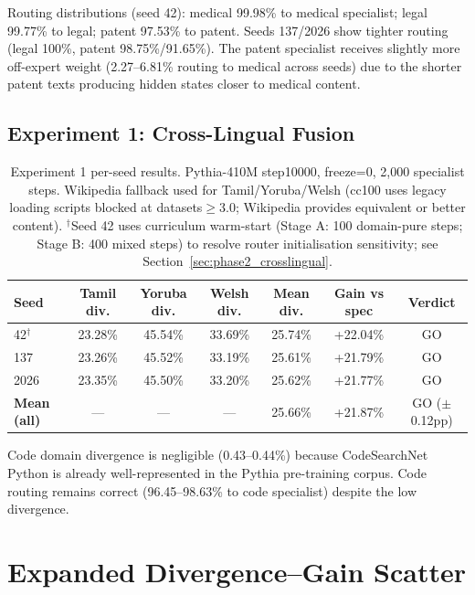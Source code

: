\documentclass{article}
\begin{document}
Routing distributions (seed 42): medical 99.98\% to medical specialist; legal 99.77\% to legal; patent 97.53\% to patent. Seeds 137/2026 show tighter routing (legal 100\%, patent 98.75\%/91.65\%). The patent specialist receives slightly more off-expert weight (2.27--6.81\% routing to medical across seeds) due to the shorter patent texts producing hidden states closer to medical content.

\subsection{Experiment 1: Cross-Lingual Fusion}
\label{app:phase2_crosslingual}

\begin{table}[h]
\centering
\caption{Experiment 1 per-seed results. Pythia-410M step10000, freeze=0, 2,000 specialist steps. Wikipedia fallback used for Tamil/Yoruba/Welsh (cc100 uses legacy loading scripts blocked at datasets$\geq$3.0; Wikipedia provides equivalent or better content). $^\dagger$Seed 42 uses curriculum warm-start (Stage A: 100 domain-pure steps; Stage B: 400 mixed steps) to resolve router initialisation sensitivity; see Section~\ref{sec:phase2_crosslingual}.}
\label{tab:app_phase2_crosslingual}
\small
\begin{tabular}{lcccccc}
\toprule
\textbf{Seed} & \textbf{Tamil div.} & \textbf{Yoruba div.} & \textbf{Welsh div.} & \textbf{Mean div.} & \textbf{Gain vs spec} & \textbf{Verdict} \\
\midrule
42$^\dagger$   & 23.28\% & 45.54\% & 33.69\% & 25.74\% & +22.04\% & GO \\
137  & 23.26\% & 45.52\% & 33.19\% & 25.61\% & +21.79\% & GO \\
2026 & 23.35\% & 45.50\% & 33.20\% & 25.62\% & +21.77\% & GO \\
\midrule
\textbf{Mean (all)} & --- & --- & --- & 25.66\% & +21.87\% & GO ($\pm$0.12pp) \\
\bottomrule
\end{tabular}
\end{table}

Code domain divergence is negligible (0.43--0.44\%) because CodeSearchNet Python is already well-represented in the Pythia pre-training corpus. Code routing remains correct (96.45--98.63\% to code specialist) despite the low divergence.

\section{Expanded Divergence--Gain Scatter}
\label{app:scatter_v2}
\end{document}
